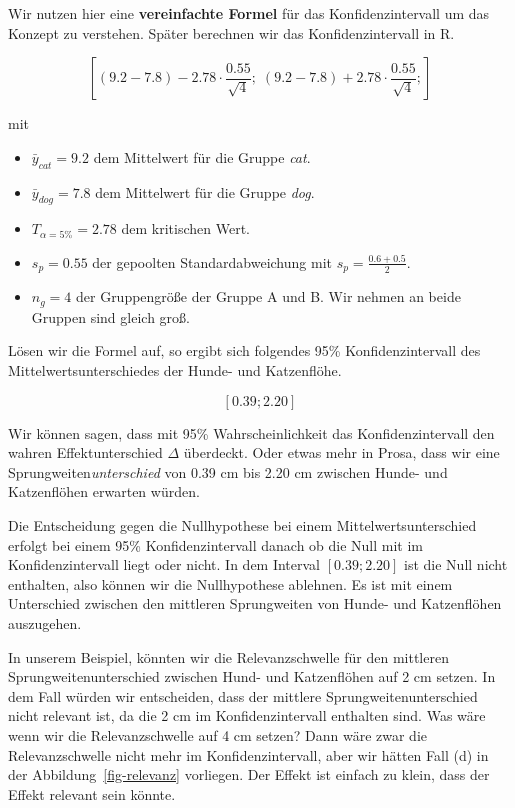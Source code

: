 \documentclass[
  letterpaper,
]{scrbook}
\providecommand{\tightlist}{%
  \setlength{\itemsep}{0pt}\setlength{\parskip}{0pt}}\usepackage{longtable,booktabs,array}
\begin{document}
Wir nutzen hier eine \textbf{vereinfachte Formel} für das
Konfidenzintervall um das Konzept zu verstehen. Später berechnen wir das
Konfidenzintervall in R.

\[
\left[
(9.2-7.8) - 
2.78 \cdot \frac {0.55}{\sqrt{4}}; \;
(9.2-7.8) + 
2.78 \cdot \frac {0.55}{\sqrt{4}};
\right]
\]

mit

\begin{itemize}
\tightlist
\item
  \(\bar{y}_{cat} = 9.2\) dem Mittelwert für die Gruppe \emph{cat}.
\item
  \(\bar{y}_{dog} = 7.8\) dem Mittelwert für die Gruppe \emph{dog}.
\item
  \(T_{\alpha = 5\%} = 2.78\) dem kritischen Wert.
\item
  \(s_p = 0.55\) der gepoolten Standardabweichung mit
  \(s_p = \tfrac{0.6 + 0.5}{2}\).
\item
  \(n_g = 4\) der Gruppengröße der Gruppe A und B. Wir nehmen an beide
  Gruppen sind gleich groß.
\end{itemize}

Lösen wir die Formel auf, so ergibt sich folgendes 95\%
Konfidenzintervall des Mittelwertsunterschiedes der Hunde- und
Katzenflöhe.

\[[0.39; 2.20]\]

Wir können sagen, dass mit 95\% Wahrscheinlichkeit das
Konfidenzintervall den wahren Effektunterschied \(\Delta\) überdeckt.
Oder etwas mehr in Prosa, dass wir eine Sprungweiten\emph{unterschied}
von 0.39 cm bis 2.20 cm zwischen Hunde- und Katzenflöhen erwarten
würden.

Die Entscheidung gegen die Nullhypothese bei einem
Mittelwertsunterschied erfolgt bei einem 95\% Konfidenzintervall danach
ob die Null mit im Konfidenzintervall liegt oder nicht. In dem Interval
\([0.39; 2.20]\) ist die Null nicht enthalten, also können wir die
Nullhypothese ablehnen. Es ist mit einem Unterschied zwischen den
mittleren Sprungweiten von Hunde- und Katzenflöhen auszugehen.

In unserem Beispiel, könnten wir die Relevanzschwelle für den mittleren
Sprungweitenunterschied zwischen Hund- und Katzenflöhen auf 2 cm setzen.
In dem Fall würden wir entscheiden, dass der mittlere
Sprungweitenunterschied nicht relevant ist, da die 2 cm im
Konfidenzintervall enthalten sind. Was wäre wenn wir die
Relevanzschwelle auf 4 cm setzen? Dann wäre zwar die Relevanzschwelle
nicht mehr im Konfidenzintervall, aber wir hätten Fall (d) in der
Abbildung~\ref{fig-relevanz} vorliegen. Der Effekt ist einfach zu klein,
dass der Effekt relevant sein könnte.
\end{document}

